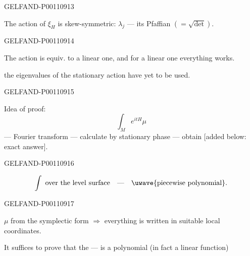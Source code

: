 \begin{GelfandAdjacentEvidence}{GELFAND-P001109}{13}


The action of $\xi_H$ is skew-symmetric: $\lambda_j$ — its Pfaffian $(=\sqrt{\det})$.
\end{GelfandAdjacentEvidence}
\begin{GelfandAdjacentEvidence}{GELFAND-P001109}{14}


The action is equiv. to a linear one, and for a linear one everything works.

 the eigenvalues of the stationary action have yet to be used.
\end{GelfandAdjacentEvidence}
\begin{GelfandAdjacentEvidence}{GELFAND-P001109}{15}


Idea of proof:
\[
\int_M e^{itH}\mu
\]
— Fourier transform — calculate by stationary phase — obtain
[added below: exact answer].
\end{GelfandAdjacentEvidence}
\begin{GelfandAdjacentEvidence}{GELFAND-P001109}{16}


\[
\int\ \text{over the level surface}\quad\text{—}\quad\text{\uwave{piecewise polynomial}.}
\]
\end{GelfandAdjacentEvidence}
\begin{GelfandAdjacentEvidence}{GELFAND-P001109}{17}


$\mu$ from the symplectic form $\Rightarrow$ everything is written in suitable local coordinates.

It suffices to prove that the  — is a polynomial (in fact a linear function)

\end{GelfandAdjacentEvidence}



